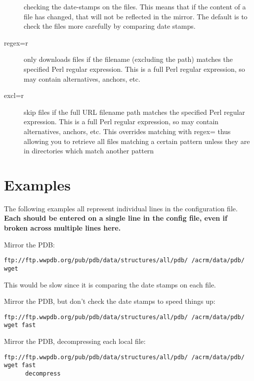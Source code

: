 \documentclass{article}
\begin{document}
\begin{description}
                  checking the date-stamps on the files. This means
                  that if the content of a file has changed, that will
                  not be reflected in the mirror. The default is to
                  check the files more carefully by comparing date
                  stamps.
\item[regex=r]    only downloads files if the filename (excluding
                  the path) matches the specified Perl regular
                  expression. This is a full Perl regular expression,
                  so may contain alternatives, anchors, etc.
\item[excl=r]     skip files if the full URL filename path matches the
                  specified Perl regular expression. This is a full
                  Perl regular expression, so may contain
                  alternatives, anchors, etc. This overrides matching
                  with regex= thus allowing you to retrieve all files
                  matching a certain pattern unless they are in 
                  directories which match another pattern
                  
\end{description}

\section{Examples}
The following examples all represent individual lines in the
 configuration file. {\bfseries Each should be entered on a single
 line in the config file, even if broken across multiple lines here.}
\vspace{1em}

\noindent Mirror the PDB:
{\footnotesize
\begin{verbatim}
ftp://ftp.wwpdb.org/pub/pdb/data/structures/all/pdb/ /acrm/data/pdb/ wget
\end{verbatim}
}
This would be slow since it is comparing the date stamps on each
file.
\vspace{1em}

\noindent Mirror the PDB, but don't check the date stamps to speed things up:
{\footnotesize
\begin{verbatim}
ftp://ftp.wwpdb.org/pub/pdb/data/structures/all/pdb/ /acrm/data/pdb/ wget fast
\end{verbatim}
}
\vspace{1em}

\noindent Mirror the PDB, decompressing each local file:
{\footnotesize
\begin{verbatim}
ftp://ftp.wwpdb.org/pub/pdb/data/structures/all/pdb/ /acrm/data/pdb/ wget fast 
      decompress
\end{verbatim}
}
\vspace{1em}
\end{document}
